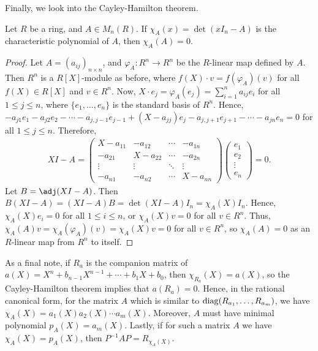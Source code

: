 Finally, we look into the Cayley-Hamilton theorem.

\begin{theorem}
    Let $R$ be a ring, and $A \in M_{n}(R)$. If $\chi_{A}(x) = \det(xI_{n} - A)$ is the characteristic polynomial of $A$, then $\chi_{A}(A) = 0$.
\end{theorem}

\begin{proof}
    Let $A = (a_{ij})_{n \times n}$, and $\varphi_{A}:R^{n} \to R^{n}$ be the $R$-linear map defined by $A$. Then $R^{n}$ is a $R[X]$-module as before, where $f(X) \cdot v = f(\varphi_{A})(v)$ for all $f(X) \in R[X]$ and $v \in R^{n}$. Now, $X \cdot e_{j} = \varphi_{A}(e_{j}) = \sum_{i=1}^{n} a_{ij}e_{i}$ for all $1 \leq j \leq n$, where $\{e_{1},\ldots,e_{n}\}$ is the standard basis of $R^{n}$. Hence, $-a_{j1}e_{1} - a_{j2}e_{2} - \cdots - a_{j,j-1}e_{j-1} + (X-a_{jj})e_{j} -a_{j,j+1}e_{j+1} - \cdots - a_{jn}e_{n} = 0$ for all $1 \leq j \leq n$. Therefore,
    \begin{align}
        XI - A = \begin{pmatrix}
            X-a_{11} & -a_{12} & \cdots & -a_{1n} \\
            -a_{21} & X-a_{22} & \cdots & -a_{2n} \\
            \vdots & \vdots & \ddots & \vdots \\
            -a_{n1} & -a_{n2} & \cdots & X-a_{nn}
        \end{pmatrix} \begin{pmatrix}
            e_{1} \\
            e_{2} \\
            \vdots \\
            e_{n}
        \end{pmatrix}
        =0.
    \end{align}
    Let $B = \adj(XI-A)$. Then $B(XI-A) = (XI-A)B = \det(XI-A)I_{n} = \chi_{A}(X)I_{n}$. Hence, $\chi_{A}(X)e_{i} = 0$ for all $1 \leq i \leq n$, or $\chi_{A}(X)v = 0$ for all $v \in R^{n}$. Thus, $\chi_{A}(A)v = \chi_{A}(\varphi_{A})(v) = \chi_{A}(X)v = 0$ for all $v \in R^{n}$, so $\chi_{A}(A) = 0$ as an $R$-linear map from $R^{n}$ to itself.
\end{proof}

As a final note, if $R_{a}$ is the companion matrix of $a(X) = X^{n} + b_{n-1}X^{n-1} + \cdots + b_{1}X + b_{0}$, then $\chi_{R_{a}}(X) = a(X)$, so the Cayley-Hamilton theorem implies that $a(R_{a}) = 0$. Hence, in the rational canonical form, for the matrix $A$ which is similar to $\operatorname{diag} (R_{a_{1}},\ldots,R_{a_{m}})$, we have $\chi_{A}(X) = a_{1}(X)a_{2}(X) \cdots a_{m}(X)$. Moreover, $A$ must have minimal polynomial $p_{A}(X) = a_{m}(X)$. Lastly, if for such a matrix $A$ we have $\chi_{A}(X) = p_{A}(X)$, then $P^{-1}AP = R_{\chi_{A}(X)}$.